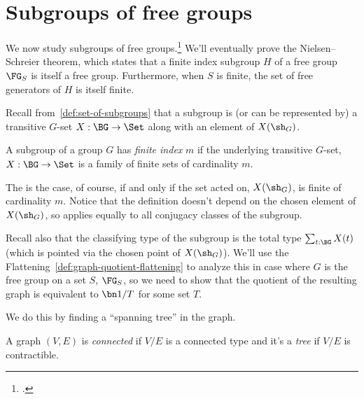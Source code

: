 \section{Subgroups of free groups}
\label{sec:subgroups-free}

We now study subgroups of free groups.\footcitetext{Swan2022}
We'll eventually prove the Nielsen--Schreier theorem,
which states that a finite index subgroup $H$ of a free group $\FG_S$ is itself a free group.
Furthermore, when $S$ is finite, the set of free generators of $H$ is itself finite.

Recall from~\cref{def:set-of-subgroups} that a subgroup is (or can be represented by)
a transitive $G$-set $X : \BG \to \Set$ along with an element of $X(\sh_G)$.
\begin{definition}\label{def:finite-index}
  A subgroup of a group $G$ has \emph{finite index} $m$ if the underlying
  transitive $G$-set, $X : \BG \to \Set$ is a family of finite sets of cardinality $m$.
\end{definition}
The is the case, of course, if and only if the set acted on, $X(\sh_G)$, is finite
of cardinality $m$.
Notice that the definition doesn't depend on the chosen element of $X(\sh_G)$,
so applies equally to all conjugacy classes of the subgroup.

Recall also that the classifying type of the subgroup is the total type $\sum_{t:\BG}X(t)$ (which is pointed via the chosen point of $X(\sh_G)$).
We'll use the Flattening~\cref{def:graph-quotient-flattening} to analyze
this in case where $G$ is the free group on a set $S$, $\FG_S$,
so we need to show that the quotient of the resulting graph
is equivalent to $\bn 1/T$ for some set $T$.

We do this by finding a ``spanning tree'' in the graph.

\begin{definition}
  A graph $(V,E)$ is \emph{connected} if $V/E$ is a connected type
  and it's a \emph{tree} if $V/E$ is contractible.
\end{definition}

